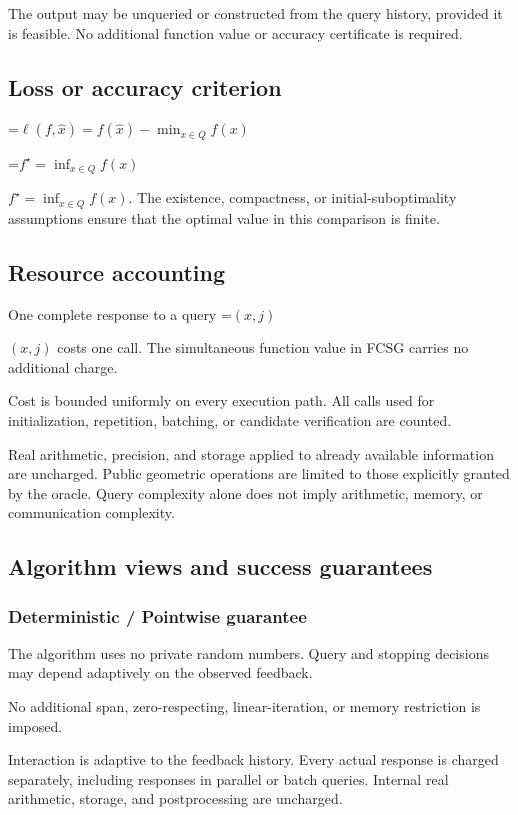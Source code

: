 \documentclass[10pt,a4paper]{article}
\newcommand{\AtlasMath}[1]{\par\begingroup\centering\setbox0=\hbox{$\displaystyle #1$}\ifdim\wd0>1.4\linewidth\typeout{ATLAS WIDE FORMULA: \the\wd0}\fi\ifdim\wd0>\linewidth\resizebox{\linewidth}{!}{\box0}\else\box0\fi\par\endgroup}
\newcommand{\AtlasInlineMath}[1]{\begingroup\setbox0=\hbox{$#1$}\ifdim\wd0>.4\linewidth\endgroup\AtlasMath{#1}\else\endgroup$#1$\fi}
\begin{document}
The output may be unqueried or constructed from the query history, provided it is feasible. No additional function value or accuracy certificate is required.

\subsection{Loss or accuracy criterion}

\AtlasMath{\ell(f,\widehat{x})=f(\widehat{x})-\min_{x\in Q}f(x)}


\AtlasInlineMath{f^\star=\inf_{x\in Q}f(x)}. The existence, compactness, or initial-suboptimality assumptions ensure that the optimal value in this comparison is finite.

\subsection{Resource accounting}
One complete response to a query \AtlasInlineMath{(x,j)} costs one call. The simultaneous function value in FCSG carries no additional charge.

Cost is bounded uniformly on every execution path. All calls used for initialization, repetition, batching, or candidate verification are counted.

Real arithmetic, precision, and storage applied to already available information are uncharged. Public geometric operations are limited to those explicitly granted by the oracle. Query complexity alone does not imply arithmetic, memory, or communication complexity.

\subsection{Algorithm views and success guarantees}
\subsubsection{Deterministic / Pointwise guarantee}
The algorithm uses no private random numbers. Query and stopping decisions may depend adaptively on the observed feedback.

No additional span, zero-respecting, linear-iteration, or memory restriction is imposed.

Interaction is adaptive to the feedback history. Every actual response is charged separately, including responses in parallel or batch queries. Internal real arithmetic, storage, and postprocessing are uncharged.
\end{document}
